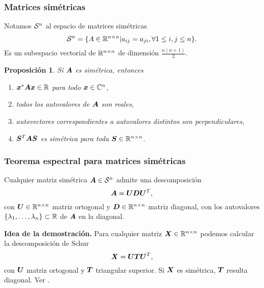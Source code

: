 \documentclass[aspectratio=169,12pt,spanish]{beamer}
\newtheorem{proposition}[theorem]{Proposición}
\begin{document}

\begin{frame}
\frametitle{Matrices simétricas}

Notamos ${\mathcal S}^n$ al espacio de matrices simétricas
$$
{\mathcal S}^n = \{A \in \mathbb{R}^{n \times n} | a_{ij} = a_{ji}, \forall 1 \le i, j \le n\}.
$$
Es un subespacio vectorial de $\mathbb{R}^{n \times n}$ de dimensión $\frac{n(n+1)}{2}$.

\begin{proposition}
Si $\bm{A}$ es simétrica, entonces
\begin{enumerate}
\item $\bm{x}^* \bm{A} \bm{x} \in \mathbb{R}$ para todo $\bm{x} \in \mathbb{C}^n$,
\item \label{item:realav} todos los autovalores de $\bm{A}$ son reales,
\item autovectores correspondientes a autovalores distintos son perpendiculares,
\item $\bm{S}^T \bm{A} \bm{S}$ es simétrica para toda $\bm{S} \in \mathbb{R}^{n\times n}$.
\end{enumerate}
\end{proposition}


\end{frame}


\begin{frame}
\frametitle{Teorema espectral para matrices simétricas}

\begin{theorem}
Cualquier matriz simétrica $\bm{A} \in {\mathcal S^n}$ admite una descomposición
$$
\bm{A} = \bm{U} \bm{D} \bm{U}^T,
$$
con $\bm{U} \in \mathbb{R}^{n\times n}$ matriz ortogonal y $\bm{D} \in \mathbb{R}^{n\times n}$ matriz diagonal, con los autovalores $\{\lambda_1, \dots, \lambda_n\} \subset \mathbb{R}$ de $\bm{A}$ en la diagonal. 
\end{theorem}

\textbf{Idea de la demostración.} Para cualquier matriz $\bm{X} \in \mathbb{R}^{n\times n}$ podemos calcular la descomposición de Schur
$$
\bm{X} = \bm{U} \bm{T} \bm{U}^T,
$$
con $\bm{U}$ matriz ortogonal y $\bm{T}$ triangular superior. Si $\bm{X}$ es simétrica, $\bm{T}$ resulta diagonal.
Ver \cite[Teorema 4.1.5]{Horn1985}.


\end{frame}

\end{document}
